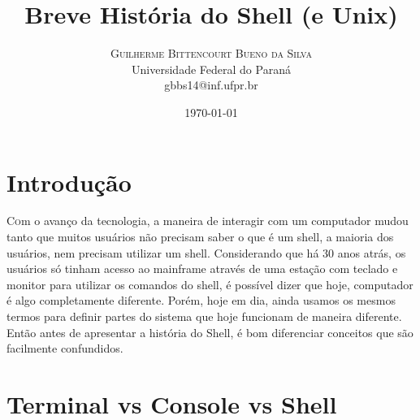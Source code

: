 \documentclass[twoside,twocolumn]{article}
\title{Breve História do Shell (e Unix)} %
\author{%
\textsc{Guilherme Bittencourt Bueno da Silva} \\[1ex] %
\normalsize Universidade Federal do Paraná \\ %
\normalsize {gbbs14@inf.ufpr.br} %
}
\date{\today} %
\begin{document}
\maketitle


\section{Introdução}

\lettrine[nindent=0em,lines=3]{C} om o avanço da tecnologia, a maneira de interagir com um computador mudou tanto que muitos usuários não precisam saber o que é um shell, a maioria dos usuários, nem precisam utilizar um shell.
Considerando que há 30 anos atrás, os usuários só tinham acesso ao mainframe através de uma estação com teclado e monitor para utilizar os comandos do shell, é possível dizer que hoje, computador é algo completamente diferente. Porém, hoje em dia, ainda usamos os mesmos termos para definir partes do sistema que hoje funcionam de maneira diferente. Então antes de apresentar a história do Shell, é bom diferenciar conceitos que são facilmente confundidos.

\section{Terminal vs Console vs Shell}
\end{document}
